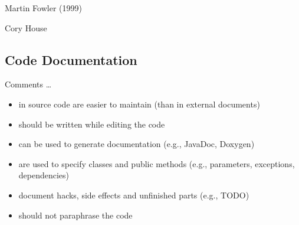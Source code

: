 \begin{frame}
	\begin{fancycolumns}[height=8.5cm]
		\vspace{-7mm}
		
		\begin{note}{Martin Fowler (1999) }
		\end{note}
	\nextcolumn
		\vspace{-7mm}
		
		\begin{note}{Cory House }
		\end{note}
	\end{fancycolumns}
\end{frame}

\subsection{Code Documentation}
\begin{frame}{\insertsubsection}
	\begin{fancycolumns}
		\begin{definition}{Comments \ldots}
			\begin{itemize}
				\item in source code are easier to maintain (than in external documents)
				\item should be written while editing the code
				\item can be used to generate documentation (e.g., JavaDoc, Doxygen)
				\item are used to specify classes and public methods (e.g., parameters, exceptions, dependencies)
				\item document hacks, side effects and unfinished parts (e.g., TODO)
				\item should not paraphrase the code
			\end{itemize}
		\end{definition}
	\end{fancycolumns}
\end{frame}

